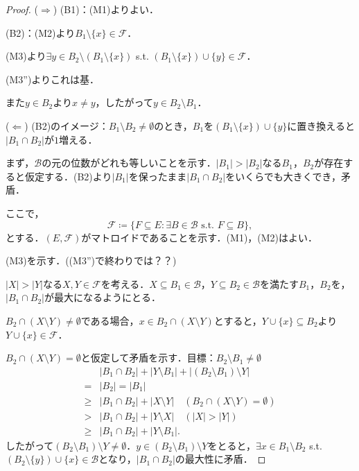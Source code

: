 \documentclass[xelatex,ja=standard,a4paper,14pt,everyparhook=compat]{bxjsarticle}
\theoremstyle{definition}
\begin{document}
\begin{proof}
    ($\Longrightarrow$)
    (B1)：(M1)よりよい．

    (B2)：(M2)より$B_1 \setminus \{x\} \in \mathcal{F}$．

    (M3)より$\exists y \in B_2 \setminus (B_1 \setminus \{x\})$ s.t. $(B_1 \setminus \{x\}) \cup \{y\} \in \mathcal{F}$．

    (M3'')よりこれは基．

    また$y \in B_2$より$x \neq y$，したがって$y \in B_2 \setminus B_1$．

    ($\Longleftarrow$)
    (B2)のイメージ：$B_1 \setminus B_2 \neq \emptyset$のとき，$B_1$を$(B_1 \setminus \{x\}) \cup \{y\}$に置き換えると$|B_1 \cap B_2|$が$1$増える．

    まず，$\mathcal{B}$の元の位数がどれも等しいことを示す．$|B_1| > |B_2|$なる$B_1$，$B_2$が存在すると仮定する．(B2)より$|B_1|$を保ったまま$|B_1 \cap B_2|$をいくらでも大きくでき，矛盾．

    ここで，
    \begin{equation*}
        \mathcal{F} \coloneqq \{F \subseteq E : \text{$\exists B \in \mathcal{B}$ s.t. $F \subseteq B$}\},
    \end{equation*}
    とする．$(E, \mathcal{F})$がマトロイドであることを示す．(M1)，(M2)はよい．

    (M3)を示す．((M3'')で終わりでは？？)

    $|X| > |Y|$なる$X, Y \in \mathcal{F}$を考える．$X \subseteq B_1 \in \mathcal{B}$，$Y \subseteq B_2 \in \mathcal{B}$を満たす$B_1$，$B_2$を，$|B_1 \cap B_2|$が最大になるようにとる．

    $B_2 \cap (X \setminus Y) \neq \emptyset$である場合，$x \in B_2 \cap (X \setminus Y)$とすると，$Y \cup \{x\} \subseteq B_2$より$Y \cup \{x\} \in \mathcal{F}$．

    $B_2 \cap (X \setminus Y) = \emptyset$と仮定して矛盾を示す．目標：$B_2 \setminus B_1 \neq \emptyset$ \begin{align*}
               & |B_1 \cap B_2| + |Y \setminus B_1| + |(B_2 \setminus B_1) \setminus Y|        \\
        ={}    & |B_2| = |B_1|                                                                 \\
        \geq{} & |B_1 \cap B_2| + |X \setminus Y| \quad (B_2 \cap (X \setminus Y) = \emptyset) \\
        >{}    & |B_1 \cap B_2| + |Y \setminus X| \quad (|X| > |Y|)                            \\
        \geq{} & |B_1 \cap B_2| + |Y \setminus B_1|.
    \end{align*}
    したがって$(B_2 \setminus B_1) \setminus Y \neq \emptyset$．$y \in (B_2 \setminus B_1) \setminus Y$をとると，$\exists x \in B_1 \setminus B_2$ s.t. $(B_2 \setminus \{y\}) \cup \{x\} \in \mathcal{B}$となり，$|B_1 \cap B_2|$の最大性に矛盾．
\end{proof}
\end{document}
